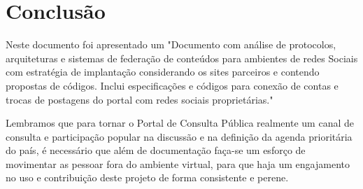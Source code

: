 \documentclass[12pt]{article}
\newcommand{\ProductDescription}{"Documento com análise de protocolos,
  arquiteturas e sistemas de federação de conteúdos para ambientes de redes
  Sociais com estratégia de implantação considerando os sites parceiros e
  contendo propostas de códigos. Inclui especificações e códigos para conexão
  de contas e trocas de postagens do portal com redes sociais proprietárias."
}
\begin{document}
\section{Conclusão}

Neste documento foi apresentado um \ProductDescription

%
%

Lembramos que para tornar o Portal de Consulta Pública realmente um canal de
consulta e participação popular na discussão e na definição da agenda
prioritária do país, é necessário que além de documentação faça-se um esforço
de movimentar as pessoar fora do ambiente virtual, para que haja um
engajamento no uso e contribuição deste projeto de forma consistente e perene.

\newpage

\newpage
\listoffigures
\newpage
\printindex
\newpage

\newpage
\appendix
\appendixpage

\end{document}
